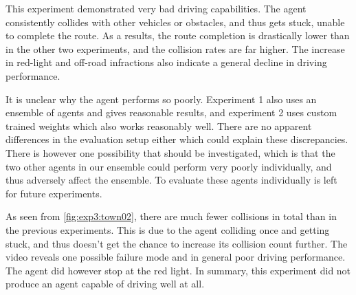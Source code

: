 This experiment demonstrated very bad driving capabilities.
The agent consistently collides with other vehicles or obstacles,
and thus gets stuck, unable to complete the route.
As a results, the route completion is drastically lower than in the other two experiments,
and the collision rates are far higher.
The increase in red-light and off-road infractions
also indicate a general decline in driving performance.

It is unclear why the agent performs so poorly.
Experiment 1 also uses an ensemble of agents and gives reasonable results,
and experiment 2 uses custom trained weights which also works reasonably well.
There are no apparent differences in the evaluation setup either which could explain these discrepancies.
There is however one possibility that should be investigated,
which is that the two other agents in our ensemble could perform very poorly individually,
and thus adversely affect the ensemble.
To evaluate these agents individually is left for future experiments.

As seen from \cref{fig:exp3:town02},
there are much fewer collisions in total than in the previous experiments.
This is due to the agent colliding once and getting stuck,
and thus doesn't get the chance to increase its collision count further.
The video reveals one possible failure mode and in general poor driving performance.
The agent did however stop at the red light.
In summary, this experiment did not produce an agent capable of driving well at all.
